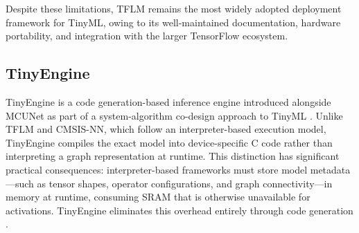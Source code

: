 \documentclass[conference]{IEEEtran}
\begin{document}
	Despite these limitations, TFLM remains the most widely adopted deployment framework for TinyML, owing to its well-maintained documentation, hardware portability, and integration with the larger TensorFlow ecosystem.
	
	
	\begin{table}[h]
		\centering
		\caption{Comparison of deployment frameworks for MCU inference}
		\label{tab:framework_comparison}
	\end{table}
	
	\subsection{TinyEngine}
	
	TinyEngine is a code generation-based inference engine introduced alongside MCUNet as part of a system-algorithm co-design approach to TinyML \cite{mcunet2020}. Unlike TFLM and CMSIS-NN, which follow an interpreter-based execution model, TinyEngine compiles the exact model into device-specific C code rather than interpreting a graph representation at runtime. This distinction has significant practical consequences: interpreter-based frameworks must store model metadata—such as tensor shapes, operator configurations, and graph connectivity—in memory at runtime, consuming SRAM that is otherwise unavailable for activations. TinyEngine eliminates this overhead entirely through code generation \cite{lin2023}.
	
\end{document}

